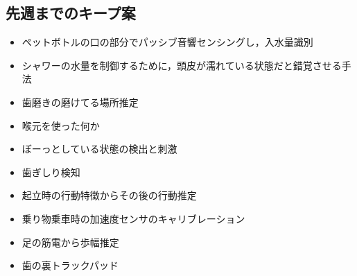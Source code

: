 \documentclass[a4j,10pt]{jarticle}
\begin{document}
\begin{multicols}{2}

  \section{先週までのキープ案}
  \begin{itemize}
    \item ペットボトルの口の部分でパッシブ音響センシングし，入水量識別
    \item シャワーの水量を制御するために，頭皮が濡れている状態だと錯覚させる手法
    \item 歯磨きの磨けてる場所推定
    \item 喉元を使った何か
    \item ぼーっとしている状態の検出と刺激
    \item 歯ぎしり検知
    \item 起立時の行動特徴からその後の行動推定
    \item 乗り物乗車時の加速度センサのキャリブレーション
    \item 足の筋電から歩幅推定
    \item 歯の裏トラックパッド
  \end{itemize}



\end{multicols}
\end{document}
